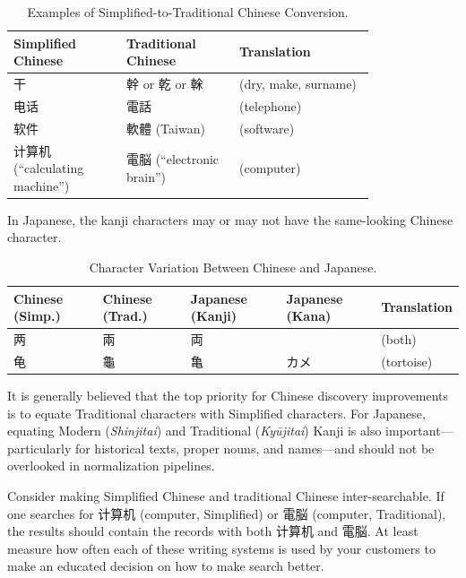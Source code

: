 \documentclass[11pt]{article}
\begin{document}
\begin{table}[h!]
    \centering
    \caption{Examples of Simplified-to-Traditional Chinese Conversion.}
    \begin{tabular}{p{0.25\linewidth} p{0.25\linewidth} p{0.3\linewidth}}
    \toprule
    \textbf{Simplified Chinese} & \textbf{Traditional Chinese} & \textbf{Translation} \\
    \midrule
    干 & 幹 or 乾 or 榦 & (dry, make, surname) \\
    电话 & 電話 & (telephone) \\
    软件 & 軟體 (Taiwan) & (software) \\
    计算机 (“calculating machine”) & 電脳 (“electronic brain”) & (computer) \\
    \bottomrule
    \end{tabular}
    \label{tab:simp_trad_conversion}
\end{table}

In Japanese, the kanji characters may or may not have the same-looking Chinese character.

\begin{table}[h!]
    \centering
    \caption{Character Variation Between Chinese and Japanese.}
    \begin{tabular}{lllll}
    \toprule
    \textbf{Chinese (Simp.)} & \textbf{Chinese (Trad.)} & \textbf{Japanese (Kanji)} & \textbf{Japanese (Kana)} & \textbf{Translation} \\
    \midrule
    两 & 兩 & 両 & & (both) \\
    龟 & 龜 & 亀 & カメ & (tortoise) \\
    \bottomrule
    \end{tabular}
    \label{tab:chinese_japanese_char_var}
\end{table}

It is generally believed that the top priority for Chinese discovery improvements is to equate Traditional characters with Simplified characters. For Japanese, equating Modern (\textit{Shinjitai}) and Traditional (\textit{Kyūjitai}) Kanji is also important—particularly for historical texts, proper nouns, and names—and should not be overlooked in normalization pipelines.

Consider making Simplified Chinese and traditional Chinese inter-searchable. If one searches for 计算机 (computer, Simplified) or 電脳 (computer, Traditional), the results should contain the records with both 计算机 and 電脳. At least measure how often each of these writing systems is used by your customers to make an educated decision on how to make search better.
\end{document}
